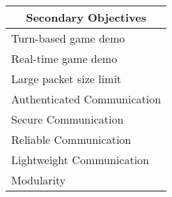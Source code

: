 \begin{table}[H]
    \centering
    \begin{tabular}{|l|}
    \hline
    \multicolumn{1}{|c|}{\textbf{Secondary   Objectives}} \\ \hline
    Turn-based game demo                                  \\ \hline
    Real-time game demo                                   \\ \hline
    Large packet size limit                               \\ \hline
    Authenticated Communication                            \\ \hline
    Secure Communication                                  \\ \hline
    Reliable Communication                                 \\ \hline
    Lightweight Communication                              \\ \hline
    Modularity                                            \\ \hline
    \end{tabular}
\end{table}
